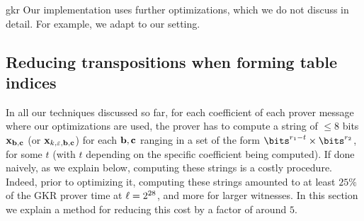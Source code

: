 \begin{lncsappendix}{gkr}
Our implementation uses further optimizations, which we do not discuss in detail. For example, we adapt \cite[Algorithm 3]{sumcheck_opt_2} to our setting.

\subsection{Reducing transpositions when forming table indices}\label{s:indices}


In all our techniques discussed so far, for each coefficient of each prover message where our optimizations are used, the prover has to compute a string of $\leq 8$ bits $\mathbf{x}_{\mathbf{b},\mathbf{c}}$  (or $\mathbf{x}_{k,\varepsilon,\mathbf{b},\mathbf{c}}$) for each $\mathbf{b},\mathbf{c}$ ranging in a set of the form $\bits^{r_1 - t} \times \bits^{r_2}$, for some $t$ (with $t$ depending on the specific coefficient being computed). If done naively, as we explain below, computing these strings is a costly procedure. Indeed, prior to optimizing it, computing these strings amounted to at least $25\%$ of the GKR prover time at $\ell=2^{28}$, and more for larger witnesses.  In this section we explain a method for  reducing this cost by a factor of around $5$.


\end{lncsappendix}

